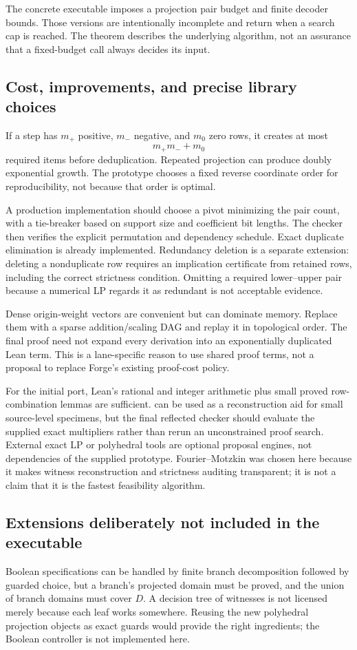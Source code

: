 The concrete executable imposes a projection pair budget and finite decoder bounds. Those versions are intentionally incomplete and return \unknown{} when a search cap is reached. The theorem describes the underlying algorithm, not an assurance that a fixed-budget call always decides its input.

\subsection{Cost, improvements, and precise library choices}
If a step has \(m_+\) positive, \(m_-\) negative, and \(m_0\) zero rows, it creates at most
\[
 m_+m_-+m_0
\]
required items before deduplication. Repeated projection can produce doubly exponential growth. The prototype chooses a fixed reverse coordinate order for reproducibility, not because that order is optimal.

A production implementation should choose a pivot minimizing the pair count, with a tie-breaker based on support size and coefficient bit lengths. The checker then verifies the explicit permutation and dependency schedule. Exact duplicate elimination is already implemented. Redundancy deletion is a separate extension: deleting a nonduplicate row requires an implication certificate from retained rows, including the correct strictness condition. Omitting a required lower--upper pair because a numerical LP regards it as redundant is not acceptable evidence.

Dense origin-weight vectors are convenient but can dominate memory. Replace them with a sparse addition/scaling DAG and replay it in topological order. The final proof need not expand every derivation into an exponentially duplicated Lean term. This is a lane-specific reason to use shared proof terms, not a proposal to replace Forge's existing proof-cost policy.

For the initial port, Lean's rational and integer arithmetic plus small proved row-combination lemmas are sufficient.  can be used as a reconstruction aid for small source-level specimens, but the final reflected checker should evaluate the supplied exact multipliers rather than rerun an unconstrained proof search. External exact LP or polyhedral tools are optional proposal engines, not dependencies of the supplied prototype. Fourier--Motzkin was chosen here because it makes witness reconstruction and strictness auditing transparent; it is not a claim that it is the fastest feasibility algorithm.

\subsection{Extensions deliberately not included in the executable}
Boolean specifications can be handled by finite branch decomposition followed by guarded choice, but a branch's projected domain must be proved, and the union of branch domains must cover \(D\). A decision tree of witnesses is not licensed merely because each leaf works somewhere. Reusing the new polyhedral projection objects as exact guards would provide the right ingredients; the Boolean controller is not implemented here.

